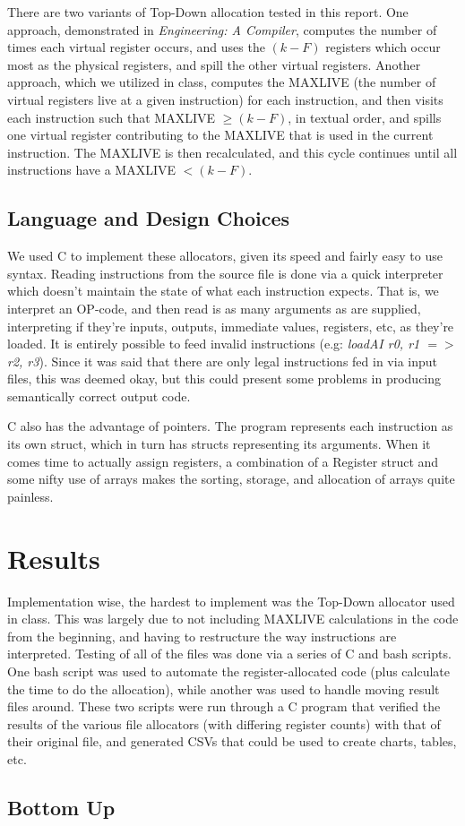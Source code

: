 \documentclass[answers]{exam}
\begin{document}
		There are two variants of Top-Down allocation tested in this report. One approach, demonstrated in \textit{Engineering: A Compiler}, computes the number of times each virtual register occurs, and uses the $(k-F)$ registers which occur most as the physical registers, and spill the other virtual registers. Another approach, which we utilized in class, computes the MAXLIVE (the number of virtual registers live at a given instruction) for each instruction, and then visits each instruction such that MAXLIVE $ \geq (k-F)$, in textual order, and spills one virtual register contributing to the MAXLIVE that is used in the current instruction. The MAXLIVE is then recalculated, and this cycle continues until all instructions have a MAXLIVE $< (k-F)$.
	
	\subsection{Language and Design Choices}
		We used C to implement these allocators, given its speed and fairly easy to use syntax. Reading instructions from the source file is done via a quick interpreter which doesn't maintain the state of what each instruction expects. That is, we interpret an OP-code, and then read is as many arguments as are supplied, interpreting if they're inputs, outputs, immediate values, registers, etc, as they're loaded. It is entirely possible to feed invalid instructions (e.g: \textit{loadAI r0, r1 $=>$ r2, r3}). Since it was said that there are only legal instructions fed in via input files, this was deemed okay, but this could present some problems in producing semantically correct output code.
		
		C also has the advantage of pointers. The program represents each instruction as its own struct, which in turn has structs representing its arguments. When it comes time to actually assign registers, a combination of a Register struct and some nifty use of arrays makes the sorting, storage, and allocation of arrays quite painless.
		
	\section{Results}
		Implementation wise, the hardest to implement was the Top-Down allocator used in class. This was largely due to not including MAXLIVE calculations in the code from the beginning, and having to restructure the way instructions are interpreted. Testing of all of the files was done via a series of C and bash scripts. One bash script was used to automate the register-allocated code (plus calculate the time to do the allocation), while another was used to handle moving result files around. These two scripts were run through a C program that verified the results of the various file allocators (with differing register counts) with that of their original file, and generated CSVs that could be used to create charts, tables, etc.
		\subsection{Bottom Up}
\end{document}
